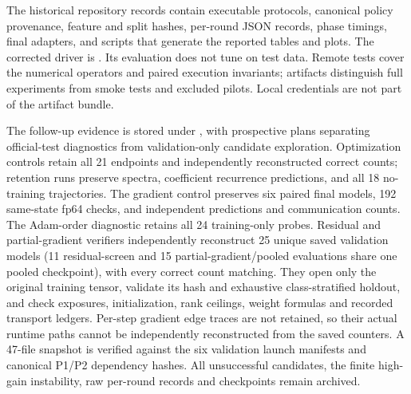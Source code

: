 \documentclass[11pt]{article}
\begin{document}
The historical repository records contain executable protocols, canonical policy provenance, feature and split hashes, per-round JSON records, phase timings, final adapters, and scripts that generate the reported tables and plots. The corrected driver is . Its evaluation does not tune on test data. Remote tests cover the numerical operators and paired execution invariants; artifacts distinguish full experiments from smoke tests and excluded pilots. Local credentials are not part of the artifact bundle.

The follow-up evidence is stored under , with prospective plans separating official-test diagnostics from validation-only candidate exploration. Optimization controls retain all 21 endpoints and independently reconstructed correct counts; retention runs preserve spectra, coefficient recurrence predictions, and all 18 no-training trajectories. The gradient control preserves six paired final models, 192 same-state fp64 checks, and independent predictions and communication counts. The Adam-order diagnostic retains all 24 training-only probes. Residual and partial-gradient verifiers independently reconstruct 25 unique saved validation models (11 residual-screen and 15 partial-gradient/pooled evaluations share one pooled checkpoint), with every correct count matching. They open only the original training tensor, validate its hash and exhaustive class-stratified holdout, and check exposures, initialization, rank ceilings, weight formulas and recorded transport ledgers. Per-step gradient edge traces are not retained, so their actual runtime paths cannot be independently reconstructed from the saved counters. A 47-file snapshot is verified against the six validation launch manifests and canonical P1/P2 dependency hashes. All unsuccessful candidates, the finite high-gain instability, raw per-round records and checkpoints remain archived.
\end{document}

